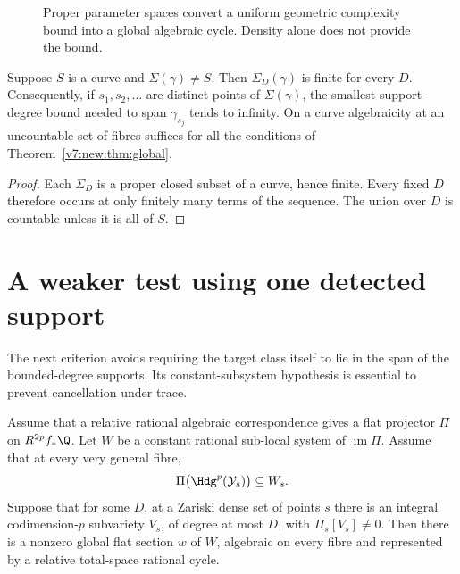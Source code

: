 \begin{figure}[ht]
\centering
{}
\caption{Proper parameter spaces convert a uniform geometric
complexity bound into a global algebraic cycle. Density alone
does not provide the bound.}
\end{figure}

\begin{corollary}
\label{v7:new:cor:escape}
Suppose \(S\) is a curve and \(\Sigma(\gamma)\ne S\). Then
\(\Sigma_D(\gamma)\) is finite for every \(D\). Consequently, if
\(s_1,s_2,\ldots\) are distinct points of \(\Sigma(\gamma)\), the
smallest support-degree bound needed to span \(\gamma_{s_j}\)
tends to infinity.
On a curve algebraicity at an uncountable set of fibres suffices
for all the conditions of Theorem~\ref{v7:new:thm:global}.
\end{corollary}

\begin{proof}
Each \(\Sigma_D\) is a proper closed subset of a curve, hence finite.
Every fixed \(D\) therefore occurs at only finitely many terms of the
sequence. The union over \(D\) is countable unless it is all of \(S\).
\end{proof}

\section{A weaker test using one detected support}

The next criterion avoids requiring the target class itself to lie
in the span of the bounded-degree supports. Its constant-subsystem
hypothesis is essential to prevent cancellation under trace.

\begin{theorem}
\label{v7:new:thm:detection}
Assume that a relative rational algebraic correspondence gives a flat
projector \(\Pi\) on \(R^{2p}f_*\Q\). Let \(W\) be a constant rational
sub-local system of \(\operatorname{im}\Pi\). Assume that at every
very general fibre,
\[
 \Pi\bigl(\Hdg^p(\mathcal Y_s)\bigr)\subseteq W_s.
\]
Suppose that for some \(D\), at a Zariski dense set of points \(s\)
there is an integral codimension-\(p\) subvariety \(V_s\), of degree
at most \(D\), with \(\Pi_s[V_s]\ne0\). Then there is a nonzero
global flat section \(w\) of \(W\), algebraic on every fibre and
represented by a relative total-space rational cycle.
\end{theorem}


